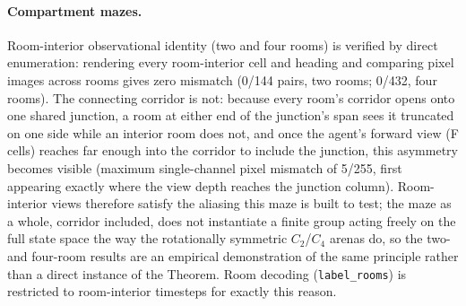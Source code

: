 \documentclass[9pt,lineno]{elife}
\begin{document}
\paragraph{Compartment mazes.} Room-interior observational identity (two and four rooms) is verified
by direct enumeration: rendering every room-interior cell and heading and comparing pixel images
across rooms gives zero mismatch (0/144 pairs, two rooms; 0/432, four rooms). The connecting corridor
is not: because every room's corridor opens onto one shared junction, a room at either end of the
junction's span sees it truncated on one side while an interior room does not, and once the agent's
forward view (F cells) reaches far enough into the corridor to include the junction, this asymmetry
becomes visible (maximum single-channel pixel mismatch of 5/255, first appearing exactly where the
view depth reaches the junction column). Room-interior views therefore satisfy the aliasing
this maze is built to test; the maze as a whole, corridor included, does not instantiate a finite
group acting freely on the full state space the way the rotationally symmetric $C_2$/$C_4$ arenas
do, so the two- and four-room results are an empirical demonstration of the same principle rather
than a direct instance of the Theorem. Room decoding (\texttt{label\_rooms}) is restricted to
room-interior timesteps for exactly this reason.
\end{document}
